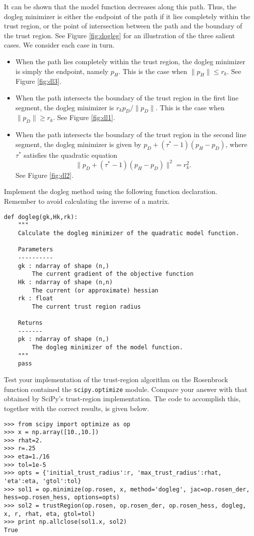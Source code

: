 It can be shown that the model function decreases along this path. Thus,
the dogleg minimizer is either the endpoint of the path if it lies completely within the trust region,
or the point of intersection between the path and the boundary of the trust region.
See Figure \ref{fig:dogleg} for an illustration of the three salient cases. We consider each case in turn.
\begin{itemize}
\item
When the path lies completely within the trust region, the dogleg minimizer is simply the endpoint, namely $p_H$.
This is the case when $\|p_H\| \leq r_k$. See Figure \ref{fig:dl3}.
\item
When the path intersects the boundary of the trust region in the first line segment, the dogleg minimizer is
$r_kp_D/\|p_D\|$.
This is the case when $\|p_D\| \geq r_k$. See Figure \ref{fig:dl1}.
\item
When the path intersects the boundary of the trust region in the second line segment, the dogleg minimizer is
given by $p_D + (\tau^*-1)(p_H-p_D)$, where $\tau^*$ satisfies the quadratic equation
\[
\|p_D + (\tau^*-1)(p_H-p_D)\|^2 = r_k^2.
\]
See Figure \ref{fig:dl2}.
\end{itemize}

\begin{problem}
Implement the dogleg method using the following function declaration.
Remember to avoid calculating the inverse of a matrix.
\begin{lstlisting}
def dogleg(gk,Hk,rk):
    """
    Calculate the dogleg minimizer of the quadratic model function.

    Parameters
    ----------
    gk : ndarray of shape (n,)
        The current gradient of the objective function
    Hk : ndarray of shape (n,n)
        The current (or approximate) hessian
    rk : float
        The current trust region radius

    Returns
    -------
    pk : ndarray of shape (n,)
        The dogleg minimizer of the model function.
    """
    pass
\end{lstlisting}


\end{problem}

Test your implementation of the trust-region algorithm on the Rosenbrock function contained the {\tt scipy.optimize} module.
Compare your answer with that obtained by SciPy's trust-region implementation. The code to accomplish this, together with the
correct results, is given below.
\begin{lstlisting}
>>> from scipy import optimize as op
>>> x = np.array([10.,10.])
>>> rhat=2.
>>> r=.25
>>> eta=1./16
>>> tol=1e-5
>>> opts = {'initial_trust_radius':r, 'max_trust_radius':rhat, 'eta':eta, 'gtol':tol}
>>> sol1 = op.minimize(op.rosen, x, method='dogleg', jac=op.rosen_der, hess=op.rosen_hess, options=opts)
>>> sol2 = trustRegion(op.rosen, op.rosen_der, op.rosen_hess, dogleg, x, r, rhat, eta, gtol=tol)
>>> print np.allclose(sol1.x, sol2)
True
\end{lstlisting}

